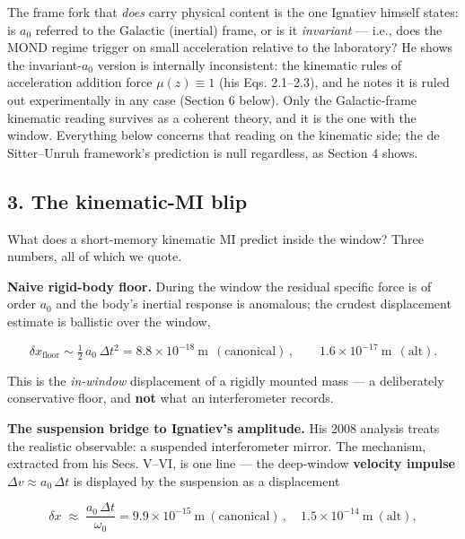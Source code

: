 \documentclass[
]{article}
\begin{document}
The frame fork that \emph{does} carry physical content is the one
Ignatiev himself states: is \(a_0\) referred to the Galactic (inertial)
frame, or is it \emph{invariant} --- i.e., does the MOND regime trigger
on small acceleration relative to the laboratory? He shows the
invariant-\(a_0\) version is internally inconsistent: the kinematic
rules of acceleration addition force \(\mu(z) \equiv 1\) (his Eqs.
2.1--2.3), and he notes it is ruled out experimentally in any case
(Section 6 below). Only the Galactic-frame kinematic reading survives as
a coherent theory, and it is the one with the window. Everything below
concerns that reading on the kinematic side; the de Sitter--Unruh
framework's prediction is null regardless, as Section 4 shows.

\subsection{3. The kinematic-MI blip}\label{the-kinematic-mi-blip}

What does a short-memory kinematic MI predict inside the window? Three
numbers, all of which we quote.

\textbf{Naive rigid-body floor.} During the window the residual specific
force is of order \(a_0\) and the body's inertial response is anomalous;
the crudest displacement estimate is ballistic over the window,

\[\delta x_\mathrm{floor} \sim \tfrac{1}{2}\,a_0\,\Delta t^2 = 8.8\times10^{-18}\ \mathrm{m}\ \ (\text{canonical})\,, \qquad 1.6\times10^{-17}\ \mathrm{m}\ \ (\text{alt}).\]

This is the \emph{in-window} displacement of a rigidly mounted mass ---
a deliberately conservative floor, and \textbf{not} what an
interferometer records.

\textbf{The suspension bridge to Ignatiev's amplitude.} His 2008
analysis treats the realistic observable: a suspended interferometer
mirror. The mechanism, extracted from his Secs. V--VI, is one line ---
the deep-window \textbf{velocity impulse}
\(\Delta v \approx a_0\,\Delta t\) is displayed by the suspension as a
displacement

\[\delta x \;\approx\; \frac{a_0\,\Delta t}{\omega_0} = 9.9\times10^{-15}\ \mathrm{m}\ (\text{canonical})\,, \quad 1.5\times10^{-14}\ \mathrm{m}\ (\text{alt}),\]
\end{document}
